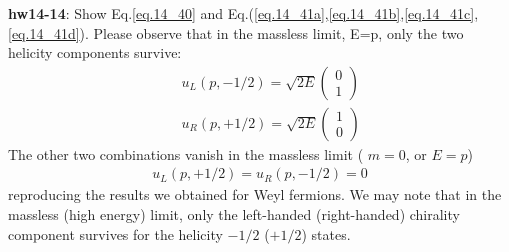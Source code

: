 \documentclass[12pt]{article}
\begin{document}
{\bf hw14-14}: Show Eq.\ref{eq.14_40} and Eq.(\ref{eq.14_41a},\ref{eq.14_41b},\ref{eq.14_41c},\ref{eq.14_41d}).
  Please observe that in the massless limit, E=p, only the two helicity
  components survive:
\begin{eqnarray}
  && u_L(p,-1/2) = \sqrt{2E}
  \begin{pmatrix}
    0 \\ 1
  \end{pmatrix} \label{eq.14_42a}\\
  &&u_R(p,+1/2) = \sqrt{2E}
  \begin{pmatrix}
    1\\0
  \end{pmatrix} \label{eq.14_42b}
\end{eqnarray}
 The other two combinations vanish in the massless limit ( $m=0$, or $E=p$)
\begin{eqnarray}
  u_L(p,+1/2) = u_R(p,-1/2) = 0 \label{eq.14_43}
\end{eqnarray}
  reproducing the results we obtained for Weyl fermions. We may note that
  in the massless (high energy) limit, only the left-handed (right-handed)
  chirality component survives for the helicity $-1/2$ ($+1/2$) states.
\end{document}
